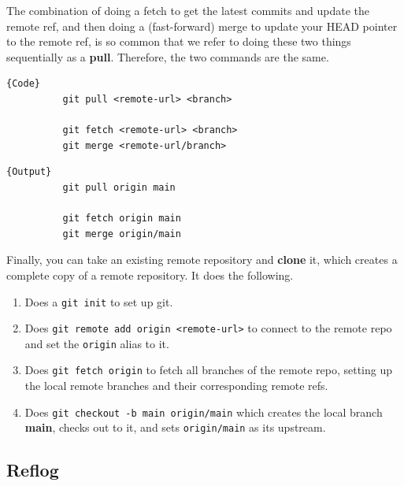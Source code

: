 \documentclass{article}
\begin{document}
    \begin{definition}[Pull]
      The combination of doing a fetch to get the latest commits and update the remote ref, and then doing a (fast-forward) merge to update your HEAD pointer to the remote ref, is so common that we refer to doing these two things sequentially as a \textbf{pull}. Therefore, the two commands are the same. 

      \noindent\begin{minipage}{.5\textwidth}
        \begin{lstlisting}[]{Code}
          git pull <remote-url> <branch> 

          git fetch <remote-url> <branch>  
          git merge <remote-url/branch>
        \end{lstlisting}
        \end{minipage}
        \hfill
        \begin{minipage}{.49\textwidth}
        \begin{lstlisting}[]{Output}
          git pull origin main 

          git fetch origin main 
          git merge origin/main
        \end{lstlisting}
      \end{minipage}
    \end{definition}

    \begin{definition}[Clone]
      Finally, you can take an existing remote repository and \textbf{clone} it, which creates a complete copy of a remote repository. It does the following. 
      \begin{enumerate}
        \item Does a \texttt{git init} to set up git. 
        \item Does \texttt{git remote add origin <remote-url>} to connect to the remote repo and set the \texttt{origin} alias to it. 
        \item Does \texttt{git fetch origin} to fetch all branches of the remote repo, setting up the local remote branches and their corresponding remote refs. 
        \item Does \texttt{git checkout -b main origin/main} which creates the local branch \textbf{main}, checks out to it, and sets \texttt{origin/main} as its upstream. 
      \end{enumerate}
    \end{definition}

  \subsection{Reflog} 
\end{document}
